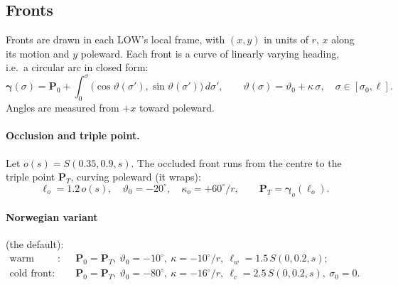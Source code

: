 \documentclass[11pt,a4paper]{article}
\begin{document}
\subsection{Fronts}
\label{sec:eq-fronts}
Fronts are drawn in each LOW's local frame, with $(x,y)$ in units of $r$, $x$ along its
motion and $y$ poleward. Each front is a curve of linearly varying heading, i.e.\ a circular
arc in closed form:
\begin{equation}
  \boldsymbol{\gamma}(\sigma)=\mathbf{P}_0+\int_0^{\sigma}
  \big(\cos\vartheta(\sigma'),\sin\vartheta(\sigma')\big)\,d\sigma',\qquad
  \vartheta(\sigma)=\vartheta_0+\kappa\,\sigma,\quad \sigma\in[\sigma_0,\ell].
\end{equation}
Angles are measured from $+x$ toward poleward.

\paragraph{Occlusion and triple point.} Let $o(s)=S(0.35,0.9,s)$. The occluded front runs from
the centre to the triple point $\mathbf{P}_T$, curving poleward (it wraps):
\begin{equation}
  \ell_o=1.2\,o(s),\quad \vartheta_0=-20^\circ,\quad \kappa_o=+60^\circ\!/r,\qquad
  \mathbf{P}_T=\boldsymbol{\gamma}_o(\ell_o).
\end{equation}

\paragraph{Norwegian variant} (the default):
\begin{align}
  \text{warm front}:&\quad \mathbf{P}_0=\mathbf{P}_T,\ \vartheta_0=-10^\circ,\ \kappa=-10^\circ\!/r,\
     \ell_w=1.5\,S(0,0.2,s);\\
  \text{cold front}:&\quad \mathbf{P}_0=\mathbf{P}_T,\ \vartheta_0=-80^\circ,\ \kappa=-16^\circ\!/r,\
     \ell_c=2.5\,S(0,0.2,s),\ \sigma_0=0.
\end{align}
\end{document}
